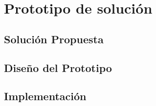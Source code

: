 \section{Prototipo de solución}
\subsection{Solución Propuesta}
\subsection{Diseño del Prototipo}
\subsection{Implementación}
